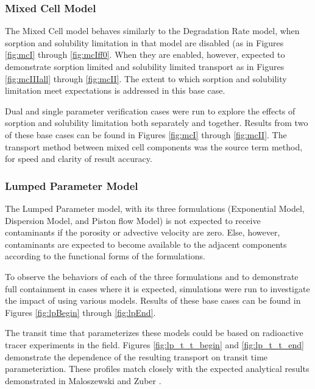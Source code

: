 \subsubsection{Mixed Cell Model}
The Mixed Cell model behaves similarly to the Degradation Rate 
model, when sorption and solubility limitation in that model are disabled (as 
in Figures \ref{fig:mcI} through \ref{fig:mcIff0}. When they are 
enabled, however, expected to demonstrate sorption limited and solubility 
limited transport as in Figures \ref{fig:mcIIIall} through \ref{fig:mcII}. The extent to which sorption and solubility limitation meet 
expectations is addressed in this base case.

Dual and single parameter verification cases were run to explore the effects of 
sorption and solubility limitation both separately and together.  Results from 
two of these base cases can be found in Figures \ref{fig:mcI} through 
\ref{fig:mcII}. The transport method between mixed cell components was the 
source term method, for speed and clarity of result accuracy.


\FloatBarrier

\subsubsection{Lumped Parameter Model}
The Lumped Parameter model, with its three formulations (Exponential Model, 
Dispersion Model, and Piston flow Model) is not expected to receive 
contaminants if the porosity or advective velocity are zero. Else, however, 
contaminants are expected to  become available to the adjacent components 
according to the functional forms of the formulations. 

To observe the behaviors of each of the three formulations and to demonstrate 
full containment in cases where it is expected, simulations were run to 
investigate the impact of using various models. Results of these base cases can be found in Figures 
\ref{fig:lpBegin} through \ref{fig:lpEnd}.



The transit time that parameterizes these models could be based on radioactive 
tracer experiments in the field. Figures \ref{fig:lp_t_t_begin} 
and \ref{fig:lp_t_t_end} demonstrate the dependence of the resulting transport on 
transit time parameteriztion. These profiles match closely with the expected 
analytical results demonstrated in Maloszewski and Zuber 
\cite{maloszewski_lumped_1996}.

